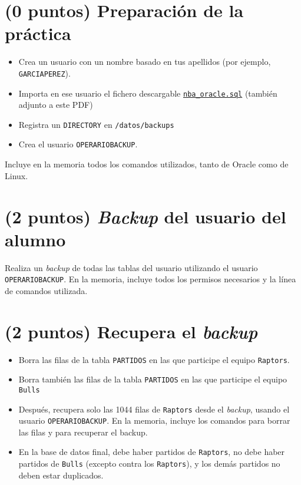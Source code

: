 \documentclass[a4paper]{article}
\begin{document}
\section*{(0 puntos) Preparación de la práctica}
\label{sec:org0000003}
\begin{itemize}
\item Crea un usuario con un nombre basado en tus apellidos (por ejemplo, \texttt{GARCIAPEREZ}).
\item Importa en ese usuario el fichero descargable \href{https://alvarogonzalezsotillo.github.io/apuntes-clase/gestion-bd-asir1/ejemplosSQL/nba\_oracle.sql}{\texttt{nba\_oracle.sql}} (también adjunto a este PDF)
\item Registra un \texttt{DIRECTORY} en \texttt{/datos/backups}
\item Crea el usuario \texttt{OPERARIOBACKUP}.
\end{itemize}

Incluye en la memoria todos los comandos utilizados, tanto de Oracle como de Linux.

\section*{(2 puntos) \emph{Backup} del usuario del alumno}
\label{sec:org0000006}
Realiza un \emph{backup} de todas las tablas del usuario utilizando el usuario \texttt{OPERARIOBACKUP}. En la memoria, incluye todos los permisos necesarios y la línea de comandos utilizada.

\section*{(2 puntos) Recupera el \emph{backup}}
\label{sec:org0000009}
\begin{itemize}
\item Borra las filas de la tabla \texttt{PARTIDOS} en las que participe el equipo \texttt{Raptors}.
\item Borra también las filas de la tabla \texttt{PARTIDOS} en las que participe el equipo \texttt{Bulls}
\item Después, recupera solo las 1044 filas de \texttt{Raptors} desde el \emph{backup}, usando el usuario \texttt{OPERARIOBACKUP}. En la memoria, incluye los comandos para borrar las filas y para recuperar el backup.
\item En la base de datos final, debe haber partidos de \texttt{Raptors}, no debe haber partidos de \texttt{Bulls} (excepto contra los \texttt{Raptors}), y los demás partidos no deben estar duplicados.
\end{itemize}
\end{document}
